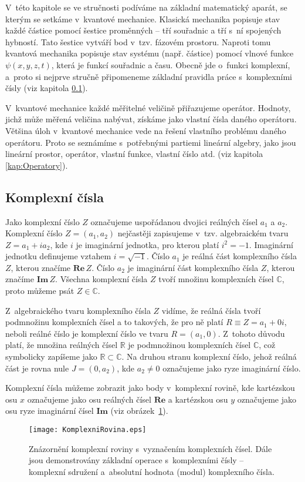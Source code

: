 V~této kapitole se ve stručnosti podíváme na základní matematický aparát, se kterým se setkáme v~kvantové mechanice. Klasická mechanika popisuje stav každé částice pomocí šestice proměnných -- tří souřadnic a tří s~ní spojených hybností. Tato šestice vytváří bod v~tzv. fázovém prostoru. Naproti tomu kvantová mechanika popisuje stav systému (např. částice) pomocí vlnové funkce $\psi(x,y,z,t)$, která je funkcí souřadnic a času. Obecně jde o~funkci komplexní, a~proto si nejprve stručně připomeneme základní pravidla práce s~komplexními čísly (viz kapitola \ref{kap:KomplexniCisla}).

V~kvantové mechanice každé měřitelné veličině přiřazujeme operátor. Hodnoty, jichž může měřená veličina nabývat, získáme jako vlastní čísla daného operátoru. Většina úloh v~kvantové mechanice vede na řešení vlastního problému daného operátoru. Proto se seznámíme s~potřebnými partiemi lineární algebry, jako jsou lineární prostor, operátor, vlastní funkce, vlastní číslo atd. (viz kapitola \ref{kap:Operatory}).

\subsection{Komplexní čísla}
\label{kap:KomplexniCisla}

Jako komplexní číslo $Z$ označujeme uspořádanou dvojici reálných čísel $a_1$ a $a_2$. Komplexní číslo $Z = (a_1, a_2)$ nejčastěji zapisujeme v~tzv. algebraickém tvaru $Z = a_1 + i a_2$, kde $i$ je imaginární jednotka, pro kterou platí $i^2 = -1$. Imaginární jednotku definujeme vztahem $i = \sqrt{-1}$. Číslo $a_1$ je reálná část komplexního čísla $Z$, kterou značíme $\mathbf{Re}\, Z$. Číslo $a_2$ je imaginární část komplexního čísla $Z$, kterou značíme $\mathbf{Im} \, Z$. Všechna komplexní čísla $Z$ tvoří množinu komplexních čísel $\mathbb{C}$, proto můžeme psát $Z \in {\mathbb{C}}$.

Z~algebraického tvaru komplexního čísla $Z$ vidíme, že reálná čísla tvoří podmnožinu komplexních čísel a to takových, že pro ně platí $R \equiv Z = a_1 + 0i$, neboli reálné číslo je komplexní číslo ve tvaru $R = (a_1, 0)$. Z~tohoto důvodu platí, že množina reálných čísel $\mathbb{R}$ je podmnožinou komplexních čísel $\mathbb{C}$, což symbolicky zapíšeme jako $\mathbb{R}\subset \mathbb{C}$. Na druhou stranu komplexní číslo, jehož reálná část je rovna nule $J=(0,a_2)$, kde $a_2 \not = 0$ označujeme jako ryze imaginární číslo.

Komplexní čísla můžeme zobrazit jako body v~komplexní rovině, kde kartézskou osu $x$ označujeme jako osu reálných čísel $\mathbf{Re}$ a kartézskou osu $y$ označujeme jako osu ryze imaginární čísel $\mathbf{Im}$ (viz obrázek~\ref{obr:RovinaKomplexnichCisel}).
\begin{figure} [ht]
\centering
\texttt{[image: KomplexniRovina.eps]}
\caption[Komplexní rovina]{Znázornění komplexní roviny s~vyznačením komplexních čísel. Dále jsou demonstrovány základní operace s~komplexními čísly -- komplexní sdružení a~absolutní hodnota (modul) komplexního čísla.}
\label{obr:RovinaKomplexnichCisel}
\end{figure}


